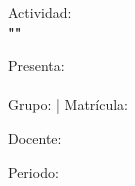 \begin{titlepage}
\begin{center}
    \vspace{1cm}
    {\large
    Actividad: \descripcion \\
    \textbf{"\myActivity"}\\[0.5cm]
    }
    \vspace{0.5cm}
    
    \begin{flushleft}
    {\large
		 Presenta:\\    
			\textbf{\authora}\\
            Grupo: \textbf{\myGroup} | Matrícula: \textbf{\myControlNumber}
	}
    \end{flushleft}

    
    \begin{flushright}
    {\Large
        Docente:
        
    		\textbf{\myReviewers}
		}
    \end{flushright}
    \vfill
    
    {\large Periodo: \myPeriod}\\
    \vspace{0.5cm}
    {\large \myDate}
    
    \end{center}
\end{titlepage}